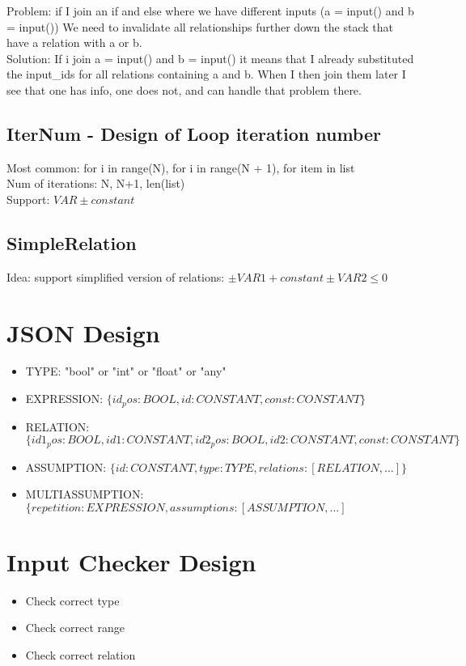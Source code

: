 \documentclass[11pt]{article}
\begin{document}
Problem: if I join an if and else where we have different inputs (a = input() and b = input()) We need to invalidate all relationships further down the stack that have a relation with a or b.\\
Solution: If i join a = input() and b = input() it means that I already substituted the input\_ids for all relations containing a and b. When I then join them later I see that one has info, one does not, and can handle that problem there.

\subsection{IterNum - Design of Loop iteration number}

Most common: for i in range(N), for i in range(N + 1), for item in list\\
Num of iterations: N, N+1, len(list)\\
Support: $VAR \pm constant$

\subsection{SimpleRelation}

Idea: support simplified version of relations: $\pm VAR1 + constant \pm VAR2 \leq 0$

\section{JSON Design}

\begin{itemize}
  \item TYPE: "bool" or "int" or "float" or "any"
  \item EXPRESSION: $\{id_pos: BOOL, id: CONSTANT, const: CONSTANT\}$
  \item RELATION:  $\{id1_pos: BOOL, id1: CONSTANT, id2_pos: BOOL, id2: CONSTANT, const: CONSTANT\}$
  \item ASSUMPTION: $\{id: CONSTANT, type: TYPE, relations: [RELATION, ...]\}$
  \item MULTIASSUMPTION: $\{repetition: EXPRESSION, assumptions: [ASSUMPTION, ...]$
\end{itemize}

\section{Input Checker Design}

\begin{itemize}
  \item Check correct type
  \item Check correct range
  \item Check correct relation
\end{itemize}
\end{document}
